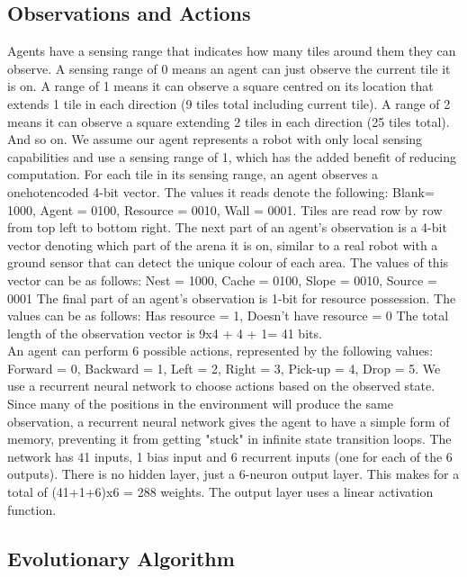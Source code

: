 \documentclass[12pt]{article}  %
\begin{document}
\subsection{Observations and Actions}

Agents have a sensing range that indicates how many tiles around them they can observe. 
A sensing range of 0 means an agent can just observe the current tile it is on. 
A range of 1 means it can observe a square centred  on its location that extends 1 tile in each direction (9 tiles total including current tile). 
A range of 2 means it can observe a square extending 2 tiles in each direction (25 tiles total). 
And so on.
We assume our agent represents a robot with only local sensing capabilities and use a sensing range of 1, which has the added benefit of reducing computation.
For each tile in its sensing range, an agent observes a onehotencoded 4-bit vector. 
The values it reads denote the following: Blank= 1000, Agent = 0100, Resource = 0010, Wall = 0001.
Tiles are read row by row from top left to bottom right. 
The next part of an agent's observation is a 4-bit vector denoting which part of the arena it is on, similar to a real robot with a ground sensor that can detect the unique colour of each area.
The values of this vector can be as follows: Nest = 1000, Cache = 0100, Slope = 0010, Source = 0001
The final part of an agent's observation is 1-bit for resource possession. 
The values can be as follows: Has resource = 1, Doesn’t have resource = 0
The total length of the observation vector is 9x4 + 4 + 1= 41 bits.\\

An agent can perform 6 possible actions, represented by the following values: Forward = 0, Backward = 1, Left = 2, Right = 3, Pick-up = 4, Drop = 5.
We use a recurrent neural network to choose actions based on the observed state.
Since many of the positions in the environment will produce the same observation, a recurrent neural network gives the agent to have a simple form of memory, preventing it from getting "stuck" in infinite state transition loops.
The network has 41 inputs, 1 bias input and 6 recurrent inputs (one for each of the 6 outputs). 
There is no hidden layer, just a 6-neuron output layer. 
This makes for a total of (41+1+6)x6 = 288 weights. 
The output layer uses a linear activation function.

\subsection{Evolutionary Algorithm}
\end{document}
